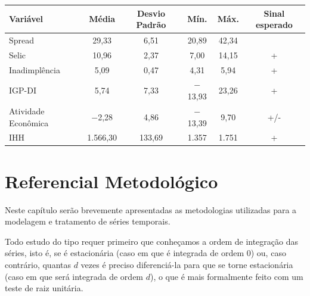 \documentclass[a4paper,
               article,
               12pt,
               openany,
               oneside,
               english,
               brazil]{abntex2}
\numberwithin{equation}{section}
\begin{document}
    \begin{table}[h]
        {%
            \begin{tabular}
                {@{\extracolsep{5pt}}lccccc}
                \midrule
                Variável              & \multicolumn{1}{c}{Média} & \multicolumn{1}{c}{Desvio Padrão} & \multicolumn{1}{c}{Mín.} & \multicolumn{1}{c}{Máx.} & \multicolumn{1}{c}{Sinal esperado} \\
                \midrule
                Spread                & 29,33                     & 6,51                              & 20,89                    & 42,34                    &  \\
                Selic                 & 10,96                     & 2,37                              & 7,00                     & 14,15                    & + \\
                Inadimplência         & 5,09                      & 0,47                              & 4,31                     & 5,94                     & + \\
                IGP-DI                & 5,74                      & 7,33                              & $-$13,93                 & 23,26                    & + \\
                Atividade Econômica   & $-$2,28                   & 4,86                              & $-$13,39                 & 9,70                     & +/- \\
                IHH                   & 1.566,30                  & 133,69                            & 1.357                    & 1.751                    & + \\
                \midrule
            \end{tabular}
        }
        {}
    \end{table}


\section{Referencial Metodológico}

    Neste capítulo serão brevemente apresentadas as metodologias utilizadas para a modelagem e tratamento de séries temporais.

    Todo estudo do tipo requer primeiro que conheçamos a ordem de integração das séries, isto é, se é estacionária (caso em que é integrada de ordem 0) ou, caso contrário, quantas $d$ vezes é preciso diferenciá-la para que se torne estacionária (caso em que será integrada de ordem $d$), o que é mais formalmente feito com um teste de raiz unitária.
\end{document}
